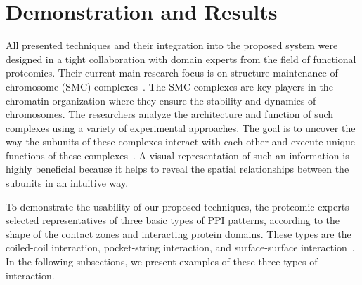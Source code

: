 \documentclass{bmcart}
\begin{document}


\section{Demonstration and Results}
All presented techniques and their integration into the proposed system were designed in a tight collaboration with domain experts from the field of functional proteomics.
Their current main research focus is on structure maintenance of chromosome (SMC) complexes~\cite{Palecek2015}. 
The SMC complexes are key players in the chromatin organization where they ensure the stability and dynamics of chromosomes. 
The researchers analyze the architecture and function of such complexes using a variety of experimental approaches. 
The goal is to uncover the way the subunits of these complexes interact with each other and execute unique functions of these complexes~\cite{Gligoris}. 
A visual representation of such an information is highly beneficial because it helps to reveal the spatial relationships between the subunits in an intuitive way.

To demonstrate the usability of our proposed techniques, the proteomic experts selected representatives of three basic types of PPI patterns, according to the shape of the contact zones and interacting protein domains.
These types are the coiled-coil interaction, pocket-string interaction, and surface-surface interaction~\cite{alberts02molecular}.
In the following subsections, we present examples of these three types of interaction. 
\end{document}
